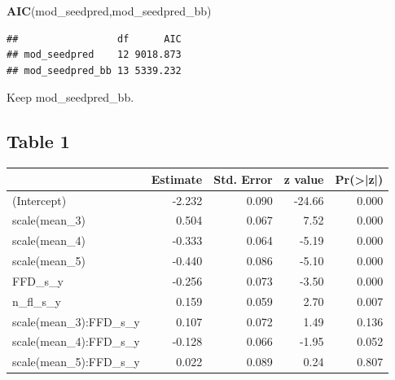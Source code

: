 \documentclass[
]{article}
\newenvironment{Shaded}{\begin{snugshade}}{\end{snugshade}}
\newcommand{\DataTypeTok}[1]{\textcolor[rgb]{0.13,0.29,0.53}{#1}}
\newcommand{\DecValTok}[1]{\textcolor[rgb]{0.00,0.00,0.81}{#1}}
\newcommand{\KeywordTok}[1]{\textcolor[rgb]{0.13,0.29,0.53}{\textbf{#1}}}
\newcommand{\NormalTok}[1]{#1}
\newcommand{\OperatorTok}[1]{\textcolor[rgb]{0.81,0.36,0.00}{\textbf{#1}}}
\begin{document}
\begin{Shaded}
\begin{Highlighting}[]
\KeywordTok{AIC}\NormalTok{(mod\_seedpred,mod\_seedpred\_bb)}
\end{Highlighting}
\end{Shaded}

\begin{verbatim}
##                 df      AIC
## mod_seedpred    12 9018.873
## mod_seedpred_bb 13 5339.232
\end{verbatim}

Keep mod\_seedpred\_bb.

\hypertarget{table-1}{%
\subsection{Table 1}\label{table-1}}

\begin{Shaded}
\end{Shaded}

\begin{table}

\centering
\begin{tabular}[t]{l|r|r|r|r}
\hline
  & Estimate & Std. Error & z value & Pr(>|z|)\\
\hline
(Intercept) & -2.232 & 0.090 & -24.66 & 0.000\\
\hline
scale(mean\_3) & 0.504 & 0.067 & 7.52 & 0.000\\
\hline
scale(mean\_4) & -0.333 & 0.064 & -5.19 & 0.000\\
\hline
scale(mean\_5) & -0.440 & 0.086 & -5.10 & 0.000\\
\hline
FFD\_s\_y & -0.256 & 0.073 & -3.50 & 0.000\\
\hline
n\_fl\_s\_y & 0.159 & 0.059 & 2.70 & 0.007\\
\hline
scale(mean\_3):FFD\_s\_y & 0.107 & 0.072 & 1.49 & 0.136\\
\hline
scale(mean\_4):FFD\_s\_y & -0.128 & 0.066 & -1.95 & 0.052\\
\hline
scale(mean\_5):FFD\_s\_y & 0.022 & 0.089 & 0.24 & 0.807\\
\hline
\end{tabular}
\centering
\begin{tabular}[t]{}
\hline

\hline
\end{tabular}
\centering
\begin{tabular}[t]{}
\hline

\hline
\end{tabular}
\end{table}
\end{document}
